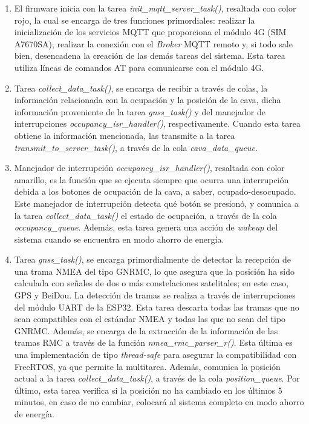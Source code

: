 \begin{enumerate}
	\item El firmware inicia con la tarea \textit{init\_mqtt\_server\_task()}, resaltada con color rojo, la cual se encarga de tres funciones primordiales: realizar la inicialización de los servicios MQTT que proporciona el módulo 4G (SIM A7670SA), realizar la conexión con el \textit{Broker} MQTT remoto y, si todo sale bien, desencadena la creación de las demás tareas del sistema. Esta tarea utiliza líneas de comandos AT para comunicarse con el módulo 4G.
	
	\item Tarea \textit{collect\_data\_task()}, se encarga de recibir a través de colas, la información relacionada con la ocupación y la posición de la cava, dicha información proveniente de la tarea \textit{gnss\_task()} y del manejador de interrupciones \textit{occupancy\_isr\_handler()}, respectivamente. Cuando esta tarea obtiene la información mencionada, las transmite a la tarea \textit{transmit\_to\_server\_task()}, a través de la cola \textit{cava\_data\_queue}.
	
	\item Manejador de interrupción \textit{occupancy\_isr\_handler()}, resaltada con color amarillo, es la función que se ejecuta siempre que ocurra una interrupción debida a los botones de ocupación de la cava, a saber, ocupado-desocupado. Este manejador de interrupción detecta qué botón se presionó, y comunica a la tarea \textit{collect\_data\_task()} el estado de ocupación, a través de la cola \textit{occupancy\_queue}. Además, esta tarea genera una acción de \textit{wakeup} del sistema cuando se encuentra en modo ahorro de energía. 	
	
	\item Tarea \textit{gnss\_task()}, se encarga primordialmente de detectar la recepción de una trama NMEA del tipo GNRMC, lo que asegura que la posición ha sido calculada con señales de dos o más constelaciones satelitales; en este caso, GPS y BeiDou. La detección de tramas se realiza a través de interrupciones del módulo UART de la ESP32. Esta tarea descarta todas las tramas que no sean compatibles con el estándar NMEA y todas las que no sean del tipo GNRMC. Además, se encarga de la extracción de la información de las tramas RMC a través de la función \textit{nmea\_rmc\_parser\_r()}. Esta última es una implementación de tipo \textit{thread-safe} para asegurar la compatibilidad con FreeRTOS, ya que permite la multitarea. Además, comunica la posición actual a la tarea \textit{collect\_data\_task()}, a través de la cola \textit{position\_queue}. Por último, esta tarea verifica si la posición no ha cambiado en los últimos 5 minutos, en caso de no cambiar, colocará al sistema completo en modo ahorro de energía. 
		

\end{enumerate}
